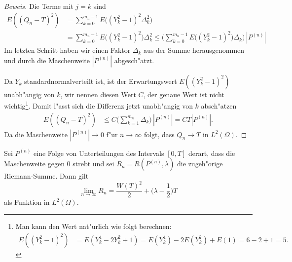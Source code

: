 \begin{proof}[Beweis]
Die Terme mit $j=k$ sind 
\begin{align*}
E((Q_n-T)^2)
&=
\sum_{k=0}^{m_n-1} E\biggl((Y_k^2-1)^2\Delta_k^2\biggr)
\\
&=
\sum_{k=0}^{m_n-1} E\bigl((Y_k^2-1)^2\bigr)\Delta_k^2
\le 
\biggl(\sum_{k=0}^{m_n-1} E\bigl((Y_k^2-1)^2\bigr)\Delta_k\biggr)\, |P^{(n)}|
\end{align*}
Im letzten Schritt haben wir einen Faktor $\Delta_k$ aus der Summe
herausgenommen und durch die Maschenweite $|P^{(n)}|$ abgesch"atzt.

Da $Y_k$ standardnormalverteilt ist, ist der Erwartungswert $E((Y_k^2-1)^2)$
unabh"angig von $k$, wir nennen diesen Wert $C$, der genaue Wert ist
nicht wichtig\footnote{Man kann den Wert nat"urlich wie folgt berechnen:
\begin{align*}
E((Y_k^2-1)^2)
&=
E(Y_k^4-2Y_k^2+1)
=
E(Y_k^4)-2E(Y_k^2)+E(1)
=
6-2+1=5.
\end{align*}}.
Damit l"asst sich die Differenz jetzt unabh"angig von $k$ absch"atzen
\begin{align*}
E((Q_n-T)^2)
&
\le
C\biggl(\sum_{k=1}^{m_n}\Delta_k\biggr)\, |P^{(n)}|
=CT|P^{(n)}|.
\end{align*}
Da die Maschenweite $|P^{(n)}|\to 0$ f"ur $n\to\infty$ folgt, dass
$Q_n\to T$ in $L^2(\Omega)$.
\end{proof}

\begin{hilfssatz} Sei $P^{(n)}$ eine Folge von Unterteilungen des
Intervals $[0,T]$ derart, dass die Maschenweite gegen $0$ strebt und
sei $R_n=R(P^{(n)},\lambda)$ die zugeh"orige Riemann-Summe.
Dann gilt
\[
\lim_{n\to\infty} R_n = \frac{W(T)^2}2 + \biggl(\lambda-\frac12\biggr)T
\]
als Funktion in $L^2(\Omega)$.
\end{hilfssatz}

